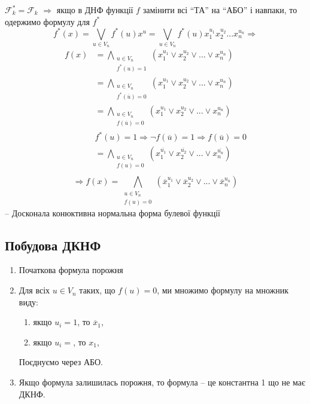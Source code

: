 \begin{corollary}
    $\mathcal{F}_k^* = \mathcal{F}_k$ $\Rightarrow$ якщо в ДНФ функції $f$ замінити всі ``ТА'' на ``АБО'' і навпаки,
    то одержимо формулу для $f^*$
    \begin{equation*}
        f^*(x) = \bigvee_{u \in V_n} f^*(u) x^u = \bigvee_{u \in V_n} f^*(u) x_1^{u_1} x_2^{u_2} ... x_n^{u_n} \Rightarrow
    \end{equation*}
    \begin{equation*}
        \begin{split}
            f(x)
            &= \bigwedge\limits_{\substack{u \in V_n \\ f^*(u) = 1}} (x_1^{u_1} \vee x_2^{u_2} \vee ... \vee x_n^{u_n}) \\
            &= \bigwedge\limits_{\substack{u \in V_n \\ f^*(\overline{u}) = 0}} (x_1^{u_1} \vee x_2^{u_2} \vee ... \vee x_n^{u_n}) \\
            &= \bigwedge\limits_{\substack{u \in V_n \\ f(\overline{u}) = 0}} (x_1^{u_1} \vee x_2^{u_2} \vee ... \vee x_n^{u_n}) \\
            & f^*(u) = 1 \Rightarrow \neg f(\overline{u}) = 1 \Rightarrow f(\overline{u}) = 0\\
            &= \bigwedge\limits_{\substack{u \in V_n \\ f(u) = 0}} (x_1^{\overline{u_1}} \vee x_2^{\overline{u_2}} \vee ... \vee x_n^{\overline{u_n}}) \\
        \end{split}
    \end{equation*}
    \begin{equation*}
        \Rightarrow f(x)
        = \bigwedge\limits_{\substack{u \in V_n \\ f(u) = 0}} (\overline{x}_1^{u_1} \vee \overline{x}_2^{u_2} \vee ... \vee \overline{x}_n^{u_n})
    \end{equation*}
-- Досконала конюктивна нормальна форма булевої функції 
\end{corollary}


\subsection{Побудова ДКНФ}

\begin{enumerate}
    \item Початкова формула порожня
    \item Для всіх $u \in V_n$ таких, що $f(u) = 0$, ми множимо формулу на множник виду:
    \begin{enumerate}
        \item якщо $u_i = 1$, то $\overline{x}_1$,
        \item якщо $u_i = $, то $x_1$,
    \end{enumerate}
    Поєднуємо через АБО.
    \item Якщо формула залишилась порожня, то формула -- це константна 1 що не має ДКНФ.
\end{enumerate}

